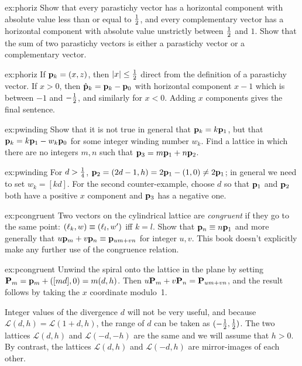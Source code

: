 \begin{jExercise}{ex:phoriz}
	Show that every parastichy vector has a horizontal component with absolute value less than or equal to $\textstyle{\frac{1}{2}}$, and every complementary vector has a horizontal component with absolute value unstrictly between $\textstyle{\frac{1}{2}}$ and $1$. Show that the sum of two parastichy vectors is either a parastichy vector or a complementary vector. 
\end{jExercise}
\begin{jAnswer}{ex:phoriz}
	If ${\mathbf p}_{k}=(x,z)$, then $|x|\leq\textstyle{\frac{1}{2}}$ direct from the definition of a parastichy vector.
	If $x>0$, then $\hat{\mathbf p}_{k}={\mathbf p}_{k}- {\mathbf p}_{0}$ with 
	horizontal component $x-1$ which is between $-1$ and $-\textstyle{\frac{1}{2}}$, and similarly for $x<0$. 
	Adding $x$ components gives the final sentence. 
\end{jAnswer}


\begin{jExercise}{ex:pwinding}
	Show that it is not true in general that ${\mathbf p}_{k}=k{\mathbf p}_{1}$, but that ${\mathbf p}_{k}=k{\mathbf p}_{1}-w_k{\mathbf p}_{0}$ for some integer winding number $w_k$. Find a lattice in which there are no integers $m,n$ such that ${\mathbf p}_{3}=m{\mathbf p}_{1}+n{\mathbf p}_{2}$. 
\end{jExercise}
\begin{jAnswer}{ex:pwinding}
	For $d>\textstyle{\frac{1}{4}}$, ${\mathbf p}_{2}= (2d-1, h)=2{\mathbf p}_{1}-(1,0)\neq 2{\mathbf p}_{1}$;   in general we need to set $w_k= [ kd]$. For the second counter-example, choose $d$ so that ${\mathbf p}_{1}$ and ${\mathbf p}_{2}$ both have a positive $x$ component and ${\mathbf p}_{3}$ has a negative one.  
\end{jAnswer}		
\begin{jExercise}{ex:pcongruent}
		Two vectors on the cylindrical lattice are \textit{congruent} if they go to the same point: $(\ell_{{k}},w)\equiv(\ell_{{l}},w')$ iff $k=l$. 
	Show that ${\mathbf p}_{n}\equiv n{\mathbf p}_{1}$ and more generally that $u{\mathbf p}_{m}+v{\mathbf p}_{n}\equiv{\mathbf p}_{um+vn}$ for integer  $u, v$.
	This book doesn't explicitly make any further use of the congruence relation. 
	\label{ex:npm}
\end{jExercise}
\begin{jAnswer}{ex:pcongruent}
	Unwind the spiral onto the lattice in the plane by setting ${\mathbf P}_{m}={\mathbf p}_{m}+([md],0)=m(d,h)$. Then $u{\mathbf P}_{m}+v{\mathbf P}_{n}={\mathbf P}_{um+vn}$, and the result follows by taking the $x$ coordinate modulo~1. 
		\end{jAnswer}
	
	
	
	Integer values of the divergence $d$ will not be very useful, and because   $\mathcal{L}(d,h)= \mathcal{L}(1+d,h)$, the range of $d$ can be taken as $(-\textstyle{\frac{1}{2}},\textstyle{\frac{1}{2}})$. The two lattices $\mathcal{L}(d,h)$ and $\mathcal{L}(-d,-h)$ are the same and we will assume that $h>0$. By contrast, the  lattices $\mathcal{L}(d,h)$ and $\mathcal{L}(-d,h)$ are mirror-images of each other.
		
